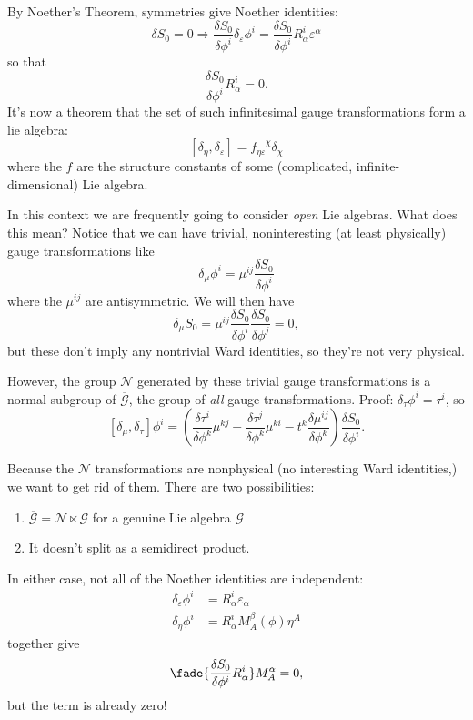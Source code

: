 By Noether's Theorem, symmetries give Noether identities:
\[
\delta S_0 = 0 \Rightarrow \frac{\delta S_0}{\delta \phi^i}{\delta_\varepsilon \phi^i} = \frac{\delta S_0}{\delta \phi^i} R^i_\alpha \varepsilon^\alpha
\]
so that
\[
\frac{\delta S_0}{\delta \phi^i} R_\alpha^i = 0.
\]
It's now a theorem that the set of such infinitesimal gauge transformations form a lie algebra:
\[
[\delta_\eta, \delta_\varepsilon] = f_{\eta \varepsilon}^{\phantom{\eta \varepsilon} \chi}\delta_\chi
\]
where the $f$ are the structure constants of some (complicated, infinite-dimensional) Lie algebra.

In this context we are frequently going to consider \emph{open} Lie algebras.
What does this mean?
Notice that we can have trivial, noninteresting (at least physically) gauge transformations like
\[
\delta_\mu \phi^i = \mu^{ij} \frac{\delta S_0}{\delta \phi^i}
\]
where the $\mu^{ij}$ are antisymmetric.
We will then have
\[
\delta_\mu S_0 = \mu^{ij} \frac{\delta S_0}{\delta \phi^i} \frac{\delta S_0}{\delta \phi^j} = 0,
\]
but these don't imply any nontrivial Ward identities, so they're not very physical.

However, the group $\mathcal N$ generated by these trivial gauge transformations is a normal subgroup of $\overline{\mathcal G}$, the group of \emph{all} gauge transformations.
Proof: $\delta_\tau \phi^i = \tau^i$, so
\[
[\delta_\mu, \delta_\tau] \phi^i = \left( \frac{\delta \tau^i}{\delta \phi^k} \mu^{kj} - \frac{\delta \tau^j}{\delta \phi^k} \mu^{ki} - t^k \frac{\delta \mu^{ij}}{\delta \phi^k} \right) \frac{\delta S_0}{\delta \phi^i}.
\]

Because the $\mathcal N$ transformations are nonphysical (no interesting Ward identities,) we want to get rid of them.
There are two possibilities:
\begin{enumerate}
    \item $\overline{\mathcal G} = \mathcal N \ltimes \mathcal G$ for a genuine Lie algebra $\mathcal G$
    \item It doesn't split as a semidirect product.
\end{enumerate}

In either case, not all of the Noether identities are independent:
\begin{align*}
\delta_\varepsilon \phi^i &= R_\alpha^i \varepsilon_\alpha\\
\delta_\eta \phi^i &= R_\alpha^i M^\beta_{A}(\phi) \eta^A
\end{align*}
together give
\[
\fade{\frac{\delta S_0}{\delta \phi^i} R_\alpha^i } M_A^\alpha = 0,
\]
but the  term is already zero!

